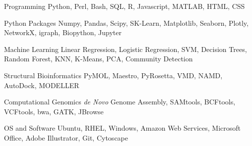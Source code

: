 \vspace{2mm}

\begin{cvskills}

  \cvskill
    {Programming} %
    {Python, Perl, Bash, SQL, R, Javascript, MATLAB, HTML, CSS} %

  \cvskill
    {Python Packages} %
    {Numpy, Pandas, Scipy, SK-Learn, Matplotlib, Seaborn, Plotly, NetworkX, igraph, Biopython, Jupyter} %
    
  \cvskill
    {Machine Learning} %
    {Linear Regression, Logistic Regression, SVM, Decision Trees, Random Forest, KNN, K-Means, PCA, Community Detection} %
    
  \cvskill
    {Structural Bioinformatics} %
    {PyMOL, Maestro, PyRosetta, VMD, NAMD, AutoDock, MODELLER} %

  \cvskill
    {Computational Genomics} %
    {\textit{de Novo} Genome Assembly, SAMtools, BCFtools, VCFtools, bwa, GATK, JBrowse} %

  \cvskill
    {OS and Software} %
    {Ubuntu, RHEL, Windows, Amazon Web Services, Microsoft Office, Adobe Illustrator, Git, Cytoscape} %
    
\vspace{-8.0mm}
\end{cvskills}